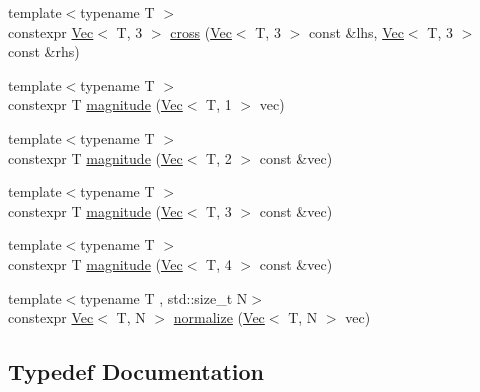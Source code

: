 \begin{DoxyCompactItemize}
\item 
{\footnotesize template$<$typename T $>$ }\\constexpr \mbox{\hyperlink{class_saturn_1_1_math_1_1_vec}{Vec}}$<$ T, 3 $>$ \mbox{\hyperlink{namespace_saturn_1_1_math_a0e0f2292e1b7ee36fac6f5839c3d3c7d}{cross}} (\mbox{\hyperlink{class_saturn_1_1_math_1_1_vec}{Vec}}$<$ T, 3 $>$ const \&lhs, \mbox{\hyperlink{class_saturn_1_1_math_1_1_vec}{Vec}}$<$ T, 3 $>$ const \&rhs)
\item 
{\footnotesize template$<$typename T $>$ }\\constexpr T \mbox{\hyperlink{namespace_saturn_1_1_math_a49cbe141235991de0c3f8a2988f90304}{magnitude}} (\mbox{\hyperlink{class_saturn_1_1_math_1_1_vec}{Vec}}$<$ T, 1 $>$ vec)
\item 
{\footnotesize template$<$typename T $>$ }\\constexpr T \mbox{\hyperlink{namespace_saturn_1_1_math_aa4fb0ab62076735134a237c374ab4dc4}{magnitude}} (\mbox{\hyperlink{class_saturn_1_1_math_1_1_vec}{Vec}}$<$ T, 2 $>$ const \&vec)
\item 
{\footnotesize template$<$typename T $>$ }\\constexpr T \mbox{\hyperlink{namespace_saturn_1_1_math_a698ac890b34dc3f4b0daf0c822ec5aa5}{magnitude}} (\mbox{\hyperlink{class_saturn_1_1_math_1_1_vec}{Vec}}$<$ T, 3 $>$ const \&vec)
\item 
{\footnotesize template$<$typename T $>$ }\\constexpr T \mbox{\hyperlink{namespace_saturn_1_1_math_a8d1fd41759eefea6aa21a3879ffb2227}{magnitude}} (\mbox{\hyperlink{class_saturn_1_1_math_1_1_vec}{Vec}}$<$ T, 4 $>$ const \&vec)
\item 
{\footnotesize template$<$typename T , std\+::size\+\_\+t N$>$ }\\constexpr \mbox{\hyperlink{class_saturn_1_1_math_1_1_vec}{Vec}}$<$ T, N $>$ \mbox{\hyperlink{namespace_saturn_1_1_math_aad3d1a0d501e45450f653fe277b675ae}{normalize}} (\mbox{\hyperlink{class_saturn_1_1_math_1_1_vec}{Vec}}$<$ T, N $>$ vec)
\end{DoxyCompactItemize}


\subsection{Typedef Documentation}
\mbox{\label{namespace_saturn_1_1_math_abf8f005e656124507aa01d3fe30156a5}} 
